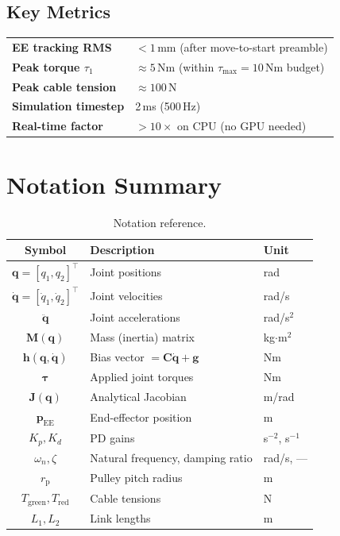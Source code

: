 \documentclass[11pt,a4paper]{article}
\newcommand{\rp}{r_{\mathrm{p}}}
\newcommand{\bq}{\bm{q}}
\newcommand{\bdq}{\dot{\bm{q}}}
\newcommand{\bddq}{\ddot{\bm{q}}}
\newcommand{\btau}{\bm{\tau}}
\newcommand{\bM}{\bm{M}}
\newcommand{\bh}{\bm{h}}
\newcommand{\bJ}{\bm{J}}
\begin{document}
\subsection{Key Metrics}

\begin{resultbox}
\begin{tabular}{ll}
    \textbf{EE tracking RMS} & $< 1$\,mm (after move-to-start preamble) \\
    \textbf{Peak torque $\tau_1$} & $\approx 5$\,Nm (within $\tau_{\max} = 10$\,Nm budget) \\
    \textbf{Peak cable tension} & $\approx 100$\,N \\
    \textbf{Simulation timestep} & 2\,ms (500\,Hz) \\
    \textbf{Real-time factor} & $> 10\times$ on CPU (no GPU needed) \\
\end{tabular}
\end{resultbox}


\section{Notation Summary}
\label{sec:notation}

\begin{table}[h]
\centering
\caption{Notation reference.}
\begin{tabular}{cll}
\toprule
\textbf{Symbol} & \textbf{Description} & \textbf{Unit} \\
\midrule
$\bq = [q_1, q_2]^\top$ & Joint positions & rad \\
$\bdq = [\dot q_1, \dot q_2]^\top$ & Joint velocities & rad/s \\
$\bddq$ & Joint accelerations & rad/s$^2$ \\
$\bM(\bq)$ & Mass (inertia) matrix & kg$\cdot$m$^2$ \\
$\bh(\bq, \bdq)$ & Bias vector $= \bm{C}\bdq + \bm{g}$ & Nm \\
$\btau$ & Applied joint torques & Nm \\
$\bJ(\bq)$ & Analytical Jacobian & m/rad \\
$\bm{p}_{\mathrm{EE}}$ & End-effector position & m \\
$K_p, K_d$ & PD gains & s$^{-2}$, s$^{-1}$ \\
$\omega_n, \zeta$ & Natural frequency, damping ratio & rad/s, --- \\
$\rp$ & Pulley pitch radius & m \\
$T_{\mathrm{green}}, T_{\mathrm{red}}$ & Cable tensions & N \\
$L_1, L_2$ & Link lengths & m \\
\bottomrule
\end{tabular}
\end{table}
\end{document}
